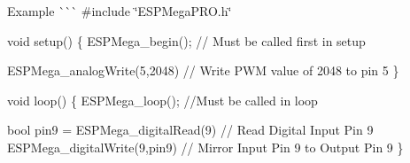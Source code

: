Example \`{}\`{}\`{} \#include \char`\"{}\+ESPMega\+PRO.\+h\char`\"{}

void setup() \{ ESPMega\+\_\+begin(); // Must be called first in setup

ESPMega\+\_\+analog\+Write(5,2048) // Write PWM value of 2048 to pin 5 \}

void loop() \{ ESPMega\+\_\+loop(); //\+Must be called in loop

bool pin9 = ESPMega\+\_\+digital\+Read(9) // Read Digital Input Pin 9 ESPMega\+\_\+digital\+Write(9,pin9) // Mirror Input Pin 9 to Output Pin 9 \} 
